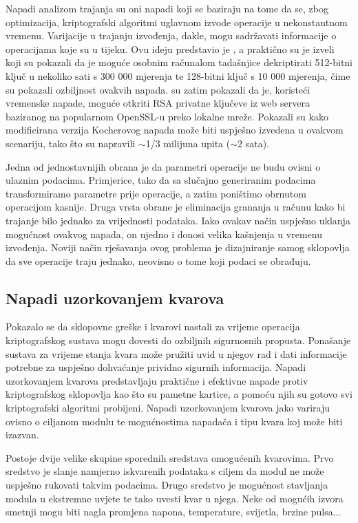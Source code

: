 \documentclass[times, utf8, diplomski]{fer}
\begin{document}
Napadi analizom trajanja  su oni napadi koji se baziraju na tome da se, zbog optimizacija, kriptografski algoritmi uglavnom izvode operacije u nekonstantnom vremenu. Varijacije u trajanju izvođenja, dakle, mogu sadržavati informacije o operacijama koje su u tijeku. Ovu ideju predstavio je \cite{kocher1996timing}, a praktično su je izveli \cite{dhem1998practical} koji su pokazali da je moguće osobnim računalom tadašnjice dekriptirati 512-bitni ključ u nekoliko sati s 300 000 mjerenja te 128-bitni ključ s 10 000 mjerenja, čime su pokazali ozbiljnost ovakvih napada. \cite{brumley2005remote} su zatim pokazali da je, koristeći vremenske napade, moguće otkriti RSA privatne ključeve iz web servera baziranog na popularnom OpenSSL-u preko lokalne mreže. Pokazali su kako modificirana verzija Kocherovog napada može biti uspješno izvedena u ovakvom scenariju, tako što su napravili $\sim$1/3 milijuna upita ($\sim$2 sata).

Jedna od jednostavnijih obrana je da parametri operacije ne budu ovisni o ulaznim podacima. Primjerice, tako da sa slučajno generiranim podacima transformiramo parametre prije operacije, a zatim poništimo obrnutom operacijom kasnije. Druga vrsta obrane je eliminacija grananja u računu kako bi trajanje bilo jednako za vrijednosti podataka. Iako ovakav način uspješno uklanja mogućnost ovakvog napada, on ujedno i donosi velika kašnjenja u vremenu izvođenja. Noviji način rješavanja ovog problema je dizajniranje samog sklopovlja da sve operacije traju jednako, neovisno o tome koji podaci se obrađuju.


\subsection{Napadi uzorkovanjem kvarova}

Pokazalo se da sklopovne greške i kvarovi nastali za vrijeme operacija kriptografskog sustava mogu dovesti do ozbiljnih sigurnosnih propusta. Ponašanje sustava za vrijeme stanja kvara može pružiti uvid u njegov rad i dati informacije potrebne za uspješno dohvaćanje prividno sigurnih informacija. Napadi uzorkovanjem kvarova  predstavljaju praktične i efektivne napade protiv kriptografskog sklopovlja kao što su pametne kartice, a pomoću njih su gotovo svi kriptografski algoritmi probijeni. Napadi uzorkovanjem kvarova jako variraju ovisno o ciljanom modulu te mogućnostima napadača i tipu kvara koj može biti izazvan.

Postoje dvije velike skupine sporednih sredstava omogućenih kvarovima. Prvo sredstvo je slanje namjerno iskvarenih podataka s ciljem da modul ne može uspješno rukovati takvim podacima. Drugo sredstvo je mogućnost stavljanja modula u ekstremne uvjete te tako uvesti kvar u njega. Neke od mogućih izvora smetnji mogu biti nagla promjena napona, temperature, svijetla, brzine pulsa...
\end{document}
